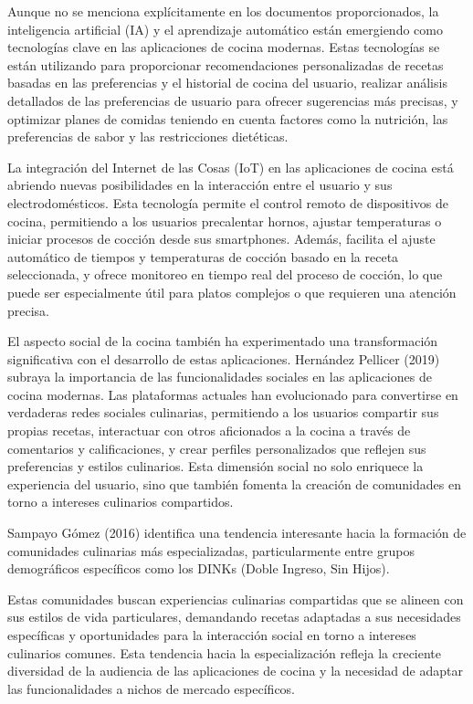 \documentclass[a4paper,12pt]{article}
\begin{document}
Aunque no se menciona explícitamente en los documentos proporcionados, la inteligencia artificial (IA) y el aprendizaje automático están emergiendo como tecnologías clave en las aplicaciones de cocina modernas. Estas tecnologías se están utilizando para proporcionar recomendaciones personalizadas de recetas basadas en las preferencias y el historial de cocina del usuario, realizar análisis detallados de las preferencias de usuario para ofrecer sugerencias más precisas, y optimizar planes de comidas teniendo en cuenta factores como la nutrición, las preferencias de sabor y las restricciones dietéticas.

La integración del Internet de las Cosas (IoT) en las aplicaciones de cocina está abriendo nuevas posibilidades en la interacción entre el usuario y sus electrodomésticos. Esta tecnología permite el control remoto de dispositivos de cocina, permitiendo a los usuarios precalentar hornos, ajustar temperaturas o iniciar procesos de cocción desde sus smartphones. Además, facilita el ajuste automático de tiempos y temperaturas de cocción basado en la receta seleccionada, y ofrece monitoreo en tiempo real del proceso de cocción, lo que puede ser especialmente útil para platos complejos o que requieren una atención precisa.

El aspecto social de la cocina también ha experimentado una transformación significativa con el desarrollo de estas aplicaciones. Hernández Pellicer (2019) subraya la importancia de las funcionalidades sociales en las aplicaciones de cocina modernas. Las plataformas actuales han evolucionado para convertirse en verdaderas redes sociales culinarias, permitiendo a los usuarios compartir sus propias recetas, interactuar con otros aficionados a la cocina a través de comentarios y calificaciones, y crear perfiles personalizados que reflejen sus preferencias y estilos culinarios. Esta dimensión social no solo enriquece la experiencia del usuario, sino que también fomenta la creación de comunidades en torno a intereses culinarios compartidos.
 
Sampayo Gómez (2016) identifica una tendencia interesante hacia la formación de comunidades culinarias más especializadas, particularmente entre grupos demográficos específicos como los DINKs (Doble Ingreso, Sin Hijos).

Estas comunidades buscan experiencias culinarias compartidas que se alineen con sus estilos de vida particulares, demandando recetas adaptadas a sus necesidades específicas y oportunidades para la interacción social en torno a intereses culinarios comunes. Esta tendencia hacia la especialización refleja la creciente diversidad de la audiencia de las aplicaciones de cocina y la necesidad de adaptar las funcionalidades a nichos de mercado específicos.
\end{document}
